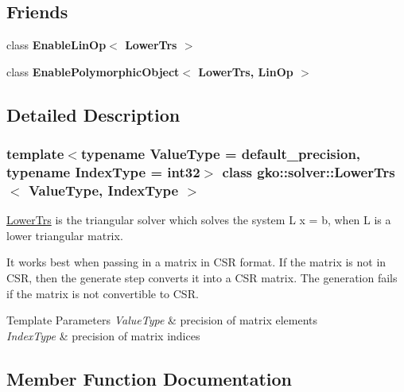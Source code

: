 \subsection*{Friends}
\begin{DoxyCompactItemize}
\item 
\mbox{\label{classgko_1_1solver_1_1LowerTrs_a5c81503df42d4ccbfaffe2853edfb9d3}} 
class {\bfseries Enable\+Lin\+Op$<$ Lower\+Trs $>$}
\item 
\mbox{\label{classgko_1_1solver_1_1LowerTrs_ab80a792714a7414ceed81c40078f3cc3}} 
class {\bfseries Enable\+Polymorphic\+Object$<$ Lower\+Trs, Lin\+Op $>$}
\end{DoxyCompactItemize}


\subsection{Detailed Description}
\subsubsection*{template$<$typename Value\+Type = default\+\_\+precision, typename Index\+Type = int32$>$\newline
class gko\+::solver\+::\+Lower\+Trs$<$ Value\+Type, Index\+Type $>$}

\hyperlink{classgko_1_1solver_1_1LowerTrs}{Lower\+Trs} is the triangular solver which solves the system L x = b, when L is a lower triangular matrix. 

It works best when passing in a matrix in C\+SR format. If the matrix is not in C\+SR, then the generate step converts it into a C\+SR matrix. The generation fails if the matrix is not convertible to C\+SR.


\begin{DoxyTemplParams}{Template Parameters}
{\em Value\+Type} & precision of matrix elements \\
\hline
{\em Index\+Type} & precision of matrix indices \\
\hline
\end{DoxyTemplParams}


\subsection{Member Function Documentation}
\mbox{\label{classgko_1_1solver_1_1LowerTrs_a9ee1b8b9f5420c4214f22d15bf61e755}} 
